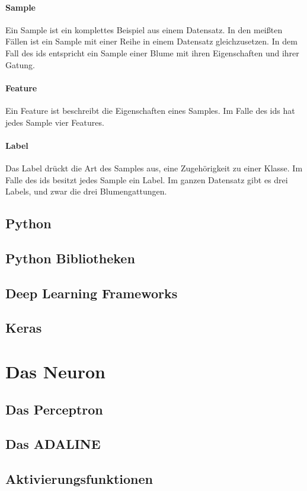 \documentclass[conference, german]{IEEEtran}
\begin{document}
\paragraph{Sample}
Ein Sample ist ein komplettes Beispiel aus einem Datensatz. 
In den meißten Fällen ist ein Sample mit einer Reihe in einem Datensatz gleichzusetzen.
In dem Fall des \ac{ids} entspricht ein Sample einer Blume mit ihren Eigenschaften und ihrer Gatung.
\paragraph{Feature}
Ein Feature ist beschreibt die Eigenschaften eines Samples.
Im Falle des \ac{ids} hat jedes Sample vier Features.
\paragraph{Label}
Das Label drückt die Art des Samples aus, eine Zugehörigkeit zu einer Klasse.
Im Falle des \ac{ids} besitzt jedes Sample ein Label. 
Im ganzen Datensatz gibt es drei Labels, und zwar die drei Blumengattungen.

\subsection{Python}
\subsection{Python Bibliotheken}
\subsection{Deep Learning Frameworks}
\subsection{Keras}
\section{Das Neuron}
\subsection{Das Perceptron}
\subsection{Das ADALINE}
\subsection{Aktivierungsfunktionen}
\end{document}
